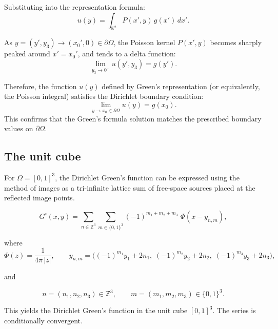\documentclass[12pt,oneside,reqno]{amsart}%
\theoremstyle{plain}
\numberwithin{equation}{section}
\begin{document}
Substituting into the representation formula:
\[
u(y) = \int_{\mathbb{R}^2} P(x', y)\, g(x')\, dx'.
\]

As $y = (y', y_3) \to (x_0', 0) \in \partial \Omega$, the Poisson kernel $P(x', y)$ becomes sharply peaked around $x' = x_0'$, and tends to a delta function:
\[
\lim_{y_3 \to 0^+} u(y', y_3) = g(y').
\]

Therefore, the function $u(y)$ defined by Green's representation (or equivalently, the Poisson integral) satisfies the Dirichlet boundary condition:
\[
\lim_{y \to x_0 \in \partial \Omega} u(y) = g(x_0).
\]
This confirms that the Green's formula solution matches the prescribed boundary values on $\partial \Omega$.

\subsection{The unit cube}\hfill

For $\Omega=[0,1]^3$,
the Dirichlet Green’s function can be expressed using the method of images as a tri-infinite lattice sum of free-space sources placed at the reflected image points.

\begin{equation}\label{Gcube}
G^\square(x,y)
= \sum_{n\in\mathbb{Z}^3}
\sum_{m\in\{0,1\}^3}
(-1)^{m_1+m_2+m_3}\;
\Phi\!\left(x - y_{n,m}\right),
\end{equation}

where
\[
\Phi(z)=\frac{1}{4\pi\,|z|},
\qquad
y_{n,m}
=\bigl(
(-1)^{m_1} y_1 + 2n_1,\;
(-1)^{m_2} y_2 + 2n_2,\;
(-1)^{m_3} y_3 + 2n_3
\bigr),
\]

and

\[
n=(n_1,n_2,n_3)\in\mathbb{Z}^3,
\qquad
m=(m_1,m_2,m_3)\in\{0,1\}^3.
\]

This yields the Dirichlet Green's function in the unit cube \([0,1]^3\). The series is conditionally convergent.
\end{document}
